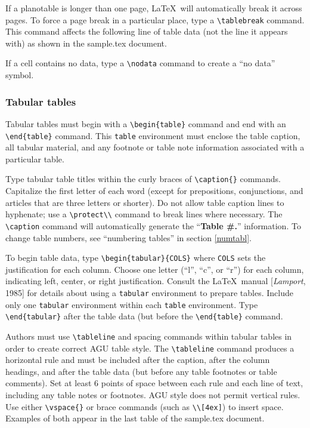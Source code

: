 \begin{article}
If a planotable is longer than one page, \LaTeX\ will 
automatically break it across pages.  To force a page 
break in a particular place, type a \verb"\tablebreak" 
command.  This command affects the following line of 
table data (not the line it appears with) as shown 
in the sample.tex document.

If a cell contains no data, type a \verb"\nodata" 
command to create a ``no data'' symbol.


\subsubsection{Tabular tables}

Tabular tables must begin with a \verb"\begin{table}" 
command and end with an \verb"\end{table}" command.
This {\tt table} environment must enclose the table 
caption, all tabular material, and any footnote or 
table note information associated with a particular table.

Type tabular table titles within the curly 
braces of \verb"\caption{}" commands.  Capitalize 
the first letter of each word (except for prepositions, 
conjunctions, and articles that are three letters or 
shorter).  Do not allow table caption lines to 
hyphenate; use a \verb"\protect\\" command to break 
lines where necessary.  The \verb"\caption" command 
will automatically generate the ``{\bf Table \#.}'' 
information.  To change table numbers, see 
``numbering tables'' in section \ref{numtabl}.

To begin table data, type \verb"\begin{tabular}{COLS}" 
where {\tt COLS} sets the justification for each column.
Choose one letter (``l'', ``c'', or ``r'') for each column,
indicating left, center, or right justification.  Consult the 
\LaTeX\ manual [{\it Lamport}, 1985] for details about using 
a {\tt tabular} environment to prepare tables.  Include only 
one {\tt tabular} environment within each {\tt table} environment.
Type \verb"\end{tabular}" after the table data (but before the 
\verb"\end{table}" command.

Authors must use \verb"\tableline" and spacing commands 
within tabular tables in order to create correct AGU 
table style.  The \verb"\tableline" command produces
a horizontal rule and must be included after the caption,
after the column headings, and after the table data (but
before any table footnotes or table comments).  Set at 
least 6 points of space between each rule and each line 
of text, including any table notes or footnotes.  AGU style
does not permit vertical rules.  Use either \verb"\vspace{}" 
or brace commands (such as \verb"\\[4ex]") to insert 
space.  Examples of both appear in the last table of the 
sample.tex document.



\end{article}
